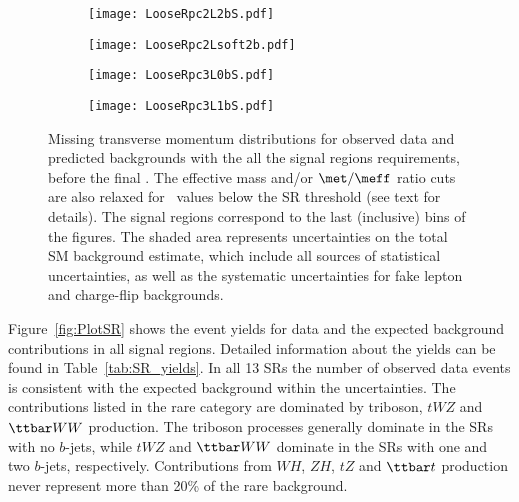 \begin{figure}[p!]
\centering
   \begin{subfigure}{0.42\textwidth}
 \texttt{[image: LooseRpc2L2bS.pdf]}
 \end{subfigure}
   \begin{subfigure}{0.42\textwidth}
 \texttt{[image: LooseRpc2Lsoft2b.pdf]}
 \end{subfigure}
   \begin{subfigure}{0.42\textwidth}
 \texttt{[image: LooseRpc3L0bS.pdf]}
 \end{subfigure}
    \begin{subfigure}{0.42\textwidth}
 \texttt{[image: LooseRpc3L1bS.pdf]}
 \end{subfigure}
   \caption{
Missing transverse momentum distributions for observed data and predicted backgrounds 
with the all the signal regions requirements, before the final \met. 
The effective mass and/or $\met/\meff$ ratio cuts are also relaxed for \met\ values below the SR threshold (see text for details). 
The signal regions correspond to the last (inclusive) bins of the figures. 
The shaded area represents uncertainties on the total SM background estimate, 
which include all sources of statistical uncertainties, 
as well as the systematic uncertainties for fake lepton and charge-flip backgrounds. 
}
\label{fig:results_datamc_rpc}
\end{figure}


Figure~\ref{fig:PlotSR} shows the event yields for data and the expected background contributions 
in all signal regions. Detailed information about the yields can be found in Table~\ref{tab:SR_yields}.
In all 13 SRs the number of observed data events is consistent with the expected background within the uncertainties. 
The contributions listed in the rare category are dominated by triboson, $tWZ$ and $\ttbar WW$ production.
The triboson processes generally dominate in the SRs with no $b$-jets, while $tWZ$ and $\ttbar WW$
dominate in the SRs with one and two $b$-jets, respectively. Contributions from $WH$, $ZH$, $tZ$ and $\ttbar t$ production 
never represent more than 20\% of the rare background.

